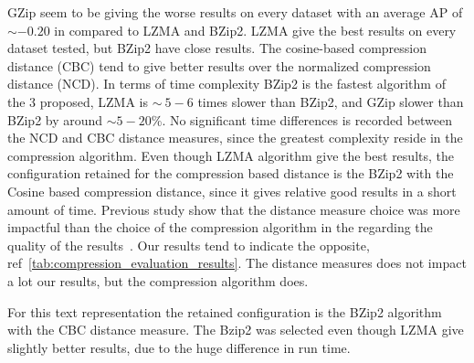 GZip seem to be giving the worse results on every dataset with an average AP of $\sim -0.20$ in compared to LZMA and BZip2.
LZMA give the best results on every dataset tested, but BZip2 have close results.
The cosine-based compression distance (CBC) tend to give better results over the normalized compression distance (NCD).
In terms of time complexity BZip2 is the fastest algorithm of the 3 proposed, LZMA is $\sim ~5-6$ times slower than BZip2, and GZip slower than BZip2 by around $\sim 5-20$\%.
No significant time differences is recorded between the NCD and CBC distance measures, since the greatest complexity reside in the compression algorithm.
Even though LZMA algorithm give the best results, the configuration retained for the compression based distance is the BZip2 with the Cosine based compression distance, since it gives relative good results in a short amount of time.
Previous study show that the distance measure choice was more impactful than the choice of the compression algorithm in the regarding the quality of the results~\cite{comparing_compression}.
Our results tend to indicate the opposite, ref~\ref{tab:compression_evaluation_results}.
The distance measures does not impact a lot our results, but the compression algorithm does.

For this text representation the retained configuration is the BZip2 algorithm with the CBC distance measure.
The Bzip2 was selected even though LZMA give slightly better results, due to the huge difference in run time.

